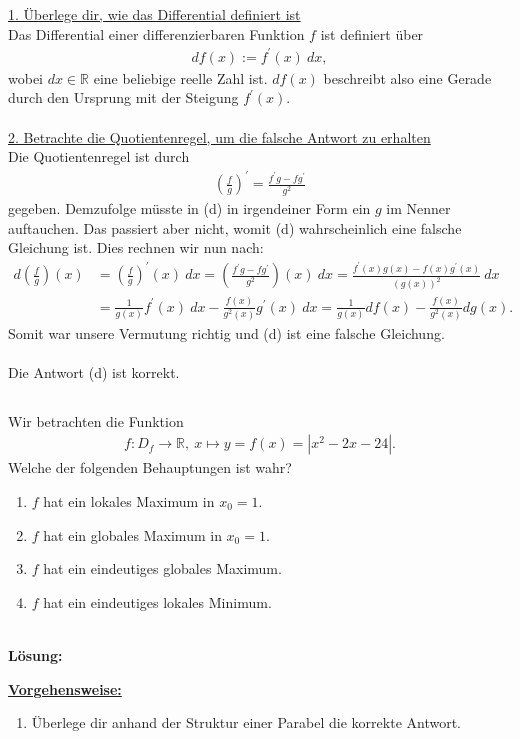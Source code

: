 \underline{1. Überlege dir, wie das Differential definiert ist}\\
Das Differential einer differenzierbaren Funktion $ f $ ist definiert über
\begin{align*}
df(x) := f^\prime(x) \ dx,
\end{align*}
wobei $ dx \in \mathbb{R} $ eine beliebige reelle Zahl ist. $ d f(x)  $ beschreibt also eine Gerade durch den Ursprung mit der Steigung $ f^\prime(x) $.\\
\\
\underline{2. Betrachte die Quotientenregel, um die falsche Antwort zu erhalten}\\
Die Quotientenregel ist durch 
\begin{align*}
\left(\frac{f}{g}\right)^\prime
= \frac{f^\prime g - f g^\prime}{g^2}
\end{align*}
gegeben. Demzufolge müsste in (d) in irgendeiner Form ein $ g $ im Nenner auftauchen.
Das passiert aber nicht, womit (d) wahrscheinlich eine falsche Gleichung ist.
Dies rechnen wir nun nach:
\begin{align*}
d \left(\frac{f}{g}\right)(x)
&= 
\left(\frac{f}{g}\right)^\prime (x) \ dx
=
\left(\frac{f^\prime g - f g^\prime}{g^2}\right) (x)  \ dx
=
\frac{f^\prime(x) g(x ) - f(x) g^\prime(x)}{(g(x))^2} \ dx\\
&=
\frac{1}{g(x)} f^\prime(x) \ dx - \frac{f(x)}{g^2(x)} g^\prime(x) \ dx
= \frac{1}{g(x)} d f(x) - \frac{f(x)}{g^2(x)} d g(x).
\end{align*}
Somit war unsere Vermutung richtig und (d) ist eine falsche Gleichung.\\
\\
Die Antwort (d) ist korrekt.



\newpage

\subsection*{}
Wir betrachten die Funktion
\begin{align*}
f : D_f \to \mathbb{R}, \ x \mapsto y = f(x) = | x^2 - 2x -24 |.
\end{align*}
Welche der folgenden Behauptungen ist wahr?
\renewcommand{\labelenumi}{(\alph{enumi})}
\begin{enumerate}
	\item 
	$ f $ hat ein lokales Maximum in $ x_0 = 1 $.
	\item
	$ f $ hat ein globales Maximum in $ x_0 = 1 $.
	\item
	$ f  $ hat ein eindeutiges globales Maximum.
	\item
	$ f $ hat ein eindeutiges lokales Minimum.
\end{enumerate}
\ \\
\textbf{Lösung:}
\begin{mdframed}
	\underline{\textbf{Vorgehensweise:}}
	\renewcommand{\labelenumi}{\theenumi.}
	\begin{enumerate}
		\item Überlege dir anhand der Struktur einer Parabel die korrekte Antwort.
	\end{enumerate}
\end{mdframed}

